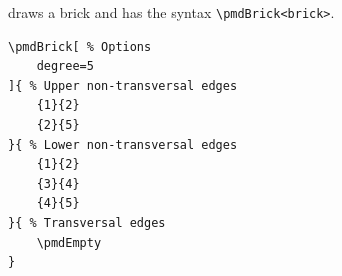 \documentclass{ltxdoc}
\begin{document}
\DescribeMacro{\pmdBrick}
draws a brick and has the syntax \verb`\pmdBrick<brick>`.
\begin{center}
    \begin{minipage}{\dimexpr0.85\textwidth-2\fboxrule-2\fboxsep\relax}
        \begin{minipage}[c]{0.4\linewidth}
\begin{verbatim}
\pmdBrick[ % Options
    degree=5
]{ % Upper non-transversal edges
    {1}{2}
    {2}{5}
}{ % Lower non-transversal edges
    {1}{2}
    {3}{4}
    {4}{5}
}{ % Transversal edges
    \pmdEmpty
}
\end{verbatim}
        \end{minipage}
        \hfill
        \begin{minipage}[c]{0.4\linewidth}
        \end{minipage}
    \end{minipage}%
\end{center}
\end{document}
